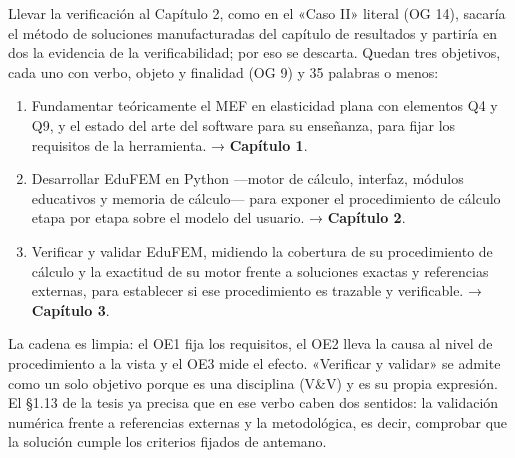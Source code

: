 \documentclass[11pt,a4paper]{article}
\begin{document}
Llevar la verificación al Capítulo 2, como en el «Caso II» literal (OG 14), sacaría el método de soluciones manufacturadas del capítulo de resultados y partiría en dos la evidencia de la verificabilidad; por eso se descarta. Quedan tres objetivos, cada uno con verbo, objeto y finalidad (OG 9) y 35 palabras o menos:
\begin{enumerate}
    \item Fundamentar teóricamente el MEF en elasticidad plana con elementos Q4 y Q9, y el estado del arte del software para su enseñanza, para fijar los requisitos de la herramienta. → \textbf{Capítulo 1}.
    \item Desarrollar EduFEM en Python ---motor de cálculo, interfaz, módulos educativos y memoria de cálculo--- para exponer el procedimiento de cálculo etapa por etapa sobre el modelo del usuario. → \textbf{Capítulo 2}.
    \item Verificar y validar EduFEM, midiendo la cobertura de su procedimiento de cálculo y la exactitud de su motor frente a soluciones exactas y referencias externas, para establecer si ese procedimiento es trazable y verificable. → \textbf{Capítulo 3}.
\end{enumerate}
La cadena es limpia: el OE1 fija los requisitos, el OE2 lleva la causa al nivel de procedimiento a la vista y el OE3 mide el efecto. «Verificar y validar» se admite como un solo objetivo porque es una disciplina (V\&V) y es su propia expresión. El §1.13 de la tesis ya precisa que en ese verbo caben dos sentidos: la validación numérica frente a referencias externas y la metodológica, es decir, comprobar que la solución cumple los criterios fijados de antemano.
\end{document}
